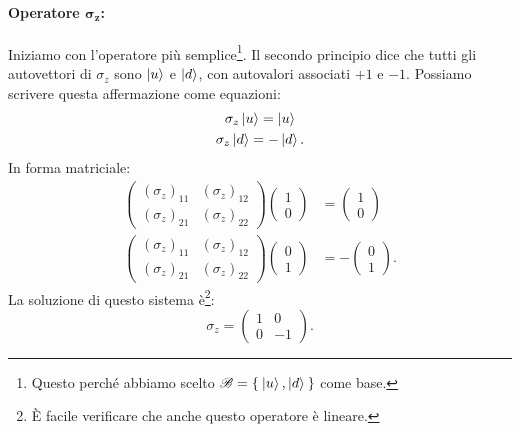 \paragraph{Operatore $\boldsymbol{\sigma_z}$:} Iniziamo con l'operatore più semplice\footnote{Questo perché abbiamo scelto $\mathscr{B} = \Set{\Ket{u}, \Ket{d}}$ come base.}. Il secondo principio dice che tutti gli autovettori di $\sigma_z$ sono $\Ket{u}$ e $\Ket{d}$, con autovalori associati $+1$ e $-1$. Possiamo scrivere questa affermazione come equazioni:
\begin{gather*}
	\sigma_z \Ket{u} = \Ket{u}  \\
	\sigma_z \Ket{d} = -\Ket{d}.
\end{gather*}
In forma matriciale:
\begin{align*}
	\begin{pmatrix}
		(\sigma_z)_{11} &  (\sigma_z)_{12}\\
		(\sigma_z)_{21} &  (\sigma_z)_{22}
	\end{pmatrix} 
	\begin{pmatrix}
		1\\
		0
	\end{pmatrix} &= 
	\begin{pmatrix}
		1\\
		0
	\end{pmatrix}\\
	\begin{pmatrix}
		(\sigma_z)_{11} &  (\sigma_z)_{12}\\
		(\sigma_z)_{21} &  (\sigma_z)_{22}
	\end{pmatrix} 
	\begin{pmatrix}
		0\\
		1
	\end{pmatrix} &= -
	\begin{pmatrix}
		0\\
		1
	\end{pmatrix}.
\end{align*}
La soluzione di questo sistema è\footnote{È facile verificare che anche questo operatore è lineare.}:
\[
\sigma_z = 
\begin{pmatrix}
	1 & 0\\
	0 & -1
\end{pmatrix}.
\label{eqn:obs_z}
\]

